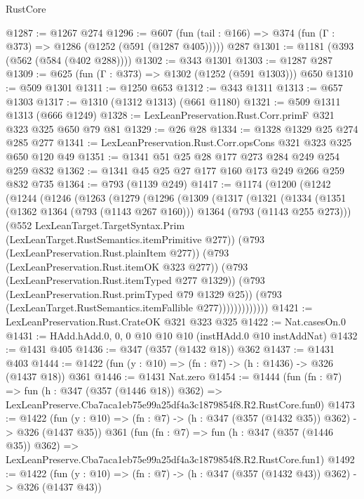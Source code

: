 \begin{lexlean}{RustCore}
\begin{coremodule}
@1287 := @1267 @274
@1296 := @607 (fun (tail : @166) => @374 (fun (Γ : @373) => @1286 (@1252 (@591 (@1287 @405))))) @287
@1301 := @1181 (@393 (@562 (@584 (@402 @288))))
@1302 := @343 @1301
@1303 := @1287 @287
@1309 := @625 (fun (Γ : @373) => @1302 (@1252 (@591 @1303))) @650
@1310 := @509 @1301
@1311 := @1250 @653
@1312 := @343 @1311
@1313 := @657 @1303
@1317 := @1310 (@1312 @1313) (@661 @1180)
@1321 := @509 @1311 @1313 (@666 @1249)
@1328 := LexLeanPreservation.Rust.Corr.primF @321 @323 @325 @650 @79 @81
@1329 := @26 @28
@1334 := @1328 @1329 @25 @274 @285 @277
@1341 := LexLeanPreservation.Rust.Corr.opsCons @321 @323 @325 @650 @120 @49
@1351 := @1341 @51 @25 @28 @177 @273 @284 @249 @254 @259 @832
@1362 := @1341 @45 @25 @27 @177 @160 @173 @249 @266 @259 @832 @735
@1364 := @793 (@1139 @249)
@1417 := @1174
    (@1200
      (@1242
        (@1244
          (@1246
            (@1263
              (@1279
                (@1296
                  (@1309
                    (@1317
                      (@1321
                        (@1334
                          (@1351
                            (@1362 @1364 (@793 (@1143 @267 @160)))
                            @1364
                            (@793 (@1143 @255 @273)))
                          (@552
                            LexLeanTarget.TargetSyntax.Prim
                            (LexLeanTarget.RustSemantics.itemPrimitive @277))
                          (@793 (LexLeanPreservation.Rust.plainItem @277))
                          (@793 (LexLeanPreservation.Rust.itemOK @323 @277))
                          (@793 (LexLeanPreservation.Rust.itemTyped @277 @1329))
                          (@793 (LexLeanPreservation.Rust.primTyped @79 @1329 @25))
                          (@793 (LexLeanTarget.RustSemantics.itemFallible @277)))))))))))))
@1421 := LexLeanPreservation.Rust.CrateOK @321 @323 @325
@1422 := Nat.casesOn.{0}
@1431 := HAdd.hAdd.{0, 0, 0} @10 @10 @10 (instHAdd.{0} @10 instAddNat)
@1432 := @1431 @405
@1436 := @347 (@357 (@1432 @18)) @362
@1437 := @1431 @403
@1444 := @1422 (fun (y : @10) => (fn : @7) -> (h : @1436) -> @326 (@1437 @18)) @361
@1446 := @1431 Nat.zero
@1454 := @1444
    (fun (fn : @7) =>
    fun (h : @347 (@357 (@1446 @18)) @362) =>
    LexLeanPreserve.Cba7aca1eb75e99a25df4a3c1879854f8.R2.RustCore.fun0)
@1473 := @1422
    (fun (y : @10) => (fn : @7) -> (h : @347 (@357 (@1432 @35)) @362) -> @326 (@1437 @35))
    @361
    (fun (fn : @7) =>
    fun (h : @347 (@357 (@1446 @35)) @362) =>
    LexLeanPreserve.Cba7aca1eb75e99a25df4a3c1879854f8.R2.RustCore.fun1)
@1492 := @1422
    (fun (y : @10) => (fn : @7) -> (h : @347 (@357 (@1432 @43)) @362) -> @326 (@1437 @43))

\end{coremodule}
\end{lexlean}
